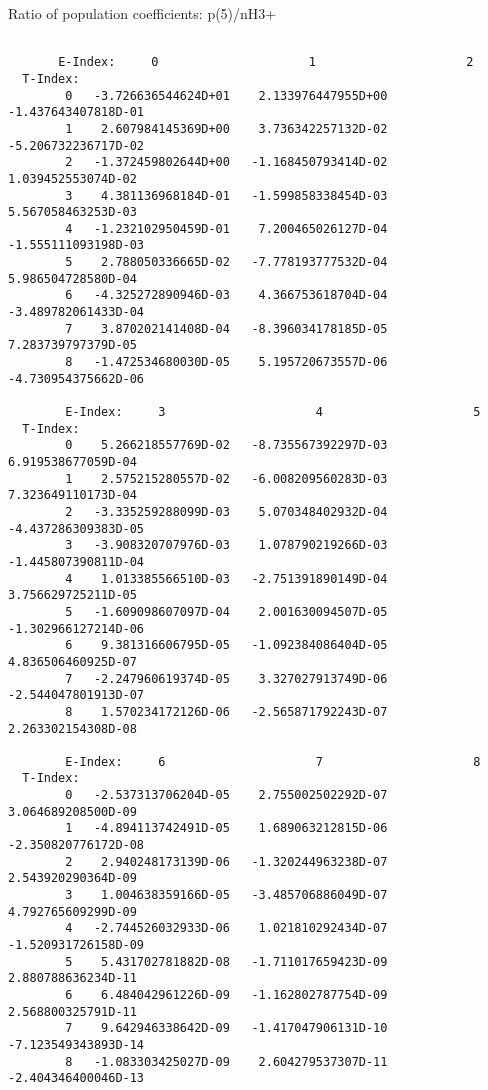 \documentclass[12pt,dvipdfmx]{article}
\begin{document}
{ Ratio of population coefficients: p(5)/nH3+

\begin{small}\begin{verbatim}

       E-Index:     0                     1                     2
  T-Index:
        0   -3.726636544624D+01    2.133976447955D+00   -1.437643407818D-01
        1    2.607984145369D+00    3.736342257132D-02   -5.206732236717D-02
        2   -1.372459802644D+00   -1.168450793414D-02    1.039452553074D-02
        3    4.381136968184D-01   -1.599858338454D-03    5.567058463253D-03
        4   -1.232102950459D-01    7.200465026127D-04   -1.555111093198D-03
        5    2.788050336665D-02   -7.778193777532D-04    5.986504728580D-04
        6   -4.325272890946D-03    4.366753618704D-04   -3.489782061433D-04
        7    3.870202141408D-04   -8.396034178185D-05    7.283739797379D-05
        8   -1.472534680030D-05    5.195720673557D-06   -4.730954375662D-06

        E-Index:     3                     4                     5
  T-Index:
        0    5.266218557769D-02   -8.735567392297D-03    6.919538677059D-04
        1    2.575215280557D-02   -6.008209560283D-03    7.323649110173D-04
        2   -3.335259288099D-03    5.070348402932D-04   -4.437286309383D-05
        3   -3.908320707976D-03    1.078790219266D-03   -1.445807390811D-04
        4    1.013385566510D-03   -2.751391890149D-04    3.756629725211D-05
        5   -1.609098607097D-04    2.001630094507D-05   -1.302966127214D-06
        6    9.381316606795D-05   -1.092384086404D-05    4.836506460925D-07
        7   -2.247960619374D-05    3.327027913749D-06   -2.544047801913D-07
        8    1.570234172126D-06   -2.565871792243D-07    2.263302154308D-08

        E-Index:     6                     7                     8
  T-Index:
        0   -2.537313706204D-05    2.755002502292D-07    3.064689208500D-09
        1   -4.894113742491D-05    1.689063212815D-06   -2.350820776172D-08
        2    2.940248173139D-06   -1.320244963238D-07    2.543920290364D-09
        3    1.004638359166D-05   -3.485706886049D-07    4.792765609299D-09
        4   -2.744526032933D-06    1.021810292434D-07   -1.520931726158D-09
        5    5.431702781882D-08   -1.711017659423D-09    2.880788636234D-11
        6    6.484042961226D-09   -1.162802787754D-09    2.568800325791D-11
        7    9.642946338642D-09   -1.417047906131D-10   -7.123549343893D-14
        8   -1.083303425027D-09    2.604279537307D-11   -2.404346400046D-13


\end{verbatim}
\end{small}}
\end{document}

